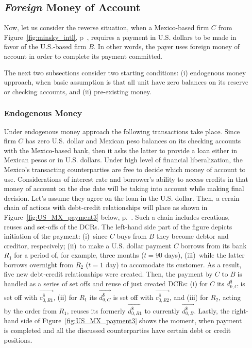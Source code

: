 \subsection{\textit{Foreign} Money of Account}\label{sec:xpay_frn}

Now, let us consider the reverse situation, when a Mexico-based firm $C$ from Figure~\ref{fig:minsky_intl}, p~\pageref{fig:minsky_intl}, requires a payment in U.S. dollars to be made in favor of the U.S.-based firm $B$. In other words, the payer uses foreign money of account in order to complete its payment committed.

The next two subsections consider two starting conditions: (i) endogenous money upproach, when basic assumption is that all unit have zero balances on its reserve or checking accounts, and (ii) pre-existing money. 

\subsubsection{Endogenous Money}

Under endogenous money approach the following transactions take place. Since firm $C$ has zero U.S. dollar and Mexican peso balances on its checking accounts with the Mexico-based bank, then it asks the latter to provide a loan either in Mexican pesos or in U.S. dollars. Under high level of financial liberalization, the Mexico's transacting counterparties are free to decide which money of account to use. Considerations of interest rate and borrower's ability to access credits in that money of account on the due date will be taking into account while making final decision. Let's assume they agree on the loan in the U.S. dollar. Then, a cerain chain of actions with debt-credit relationships will place as shown in Figure~\ref{fig:US_MX_payment3} below, p.~\pageref{fig:US_MX_payment3}. Such a chain includes creations, reuses and set-offs of the DCRs. The left-hand side part of the figure depicts initiation of the payment: (i)~since $C$ buys from $B$ they become debtor and creditor, respecively; (ii)~to make a U.S. dollar payment $C$ borrows from its bank $R_1$ for a period of, for example, three months ($t=90$ days), (iii)~while the latter borrows overnight from $R_2$ ($t=1$ day) to accomodate its customer. As a result, five new debt-credit relationships were created. Then, the payment by $C$ to $B$ is handled as a series of set offs and reuse of just created DCRs: (i) for $C$ its $d^{\$}_{0,C}$ is set off with $\overrightarrow{c^{\$}_{0,R1}}$, (ii) for $R_1$ its $\overrightarrow{d^{\$}_{0,C}}$ is set off with $\overrightarrow{c^{\$}_{0,R2}}$, and (iii) for $R_2$, acting by the order from $R_1$, reuses its formerly $\overrightarrow{d^{\$}_{0,R1}}$ to currently $\overrightarrow{d^{\$}_{0,B}}$. Lastly, the right-hand side of Figure~\ref{fig:US_MX_payment3} shows the moment, when payment is completed and all the discussed counterparties have certain debt or credit positions. 

